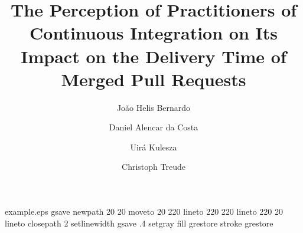 %
%
%
%
%
\begin{filecontents*}{example.eps}
	gsave
	newpath
	20 20 moveto
	20 220 lineto
	220 220 lineto
	220 20 lineto
	closepath
	2 setlinewidth
	gsave
	.4 setgray fill
	grestore
	stroke
	grestore
\end{filecontents*}
%
\RequirePackage{fix-cm}
%
\documentclass[smallextended]{svjour3}       %
%
\smartqed  %
%
\usepackage{graphicx}
\usepackage{lipsum}
\usepackage{pdfpages}
\usepackage{float}
\usepackage{caption}  %
\usepackage{subcaption} %
\usepackage{nicefrac}
\usepackage{url}
\usepackage{booktabs}
%
%
%
%


	
	\title{
		The Perception of Practitioners of Continuous Integration on Its Impact on the Delivery Time of Merged Pull Requests
	}
	
	
	\author{João Helis Bernardo         \and
		Daniel Alencar da Costa \and 
		Uirá Kulesza \and 
		Christoph Treude \and 
	}
	
